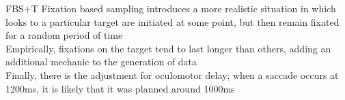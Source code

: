 \documentclass{beamer}
\begin{document}
%
%
%
%
%

\begin{frame}{FBS+T}
Fixation based sampling introduces a more realistic situation in which looks to a particular target are initiated at some point, but then remain fixated for a random period of time \newline \\

Empirically, fixations on the target tend to last longer than others, adding an additional mechanic to the generation of data \newline \\

Finally, there is the adjustment for oculomotor delay; when a saccade occurs at 1200ms, it is likely that it was planned around 1000ms \newline \\


\end{frame}
\end{document}
